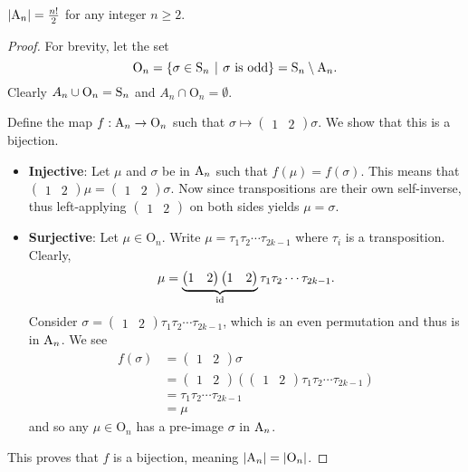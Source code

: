 \begin{proposition}\label{prop-order-of-An}
    $|\mathrm{A}_{n}| = \frac{n!}2$ for any integer $n \geq 2$.
\end{proposition}
\begin{proof}
    For brevity, let the set
    \[
        \mathrm{O}_n = \left\{\sigma \in \Sn{n} \vert \sigma \text{ is odd}\right\} = \Sn{n} \setminus \An{n}.
    \]
    Clearly $A_n \cup \mathrm{O}_n = \mathrm{S}_{n}$ and $A_n \cap \mathrm{O}_n = \emptyset$.

    Define the map $f: \mathrm{A}_{n} \to \mathrm{O}_n$ such that $\sigma \mapsto \begin{pmatrix}1 & 2\end{pmatrix}\sigma$. We show that this is a bijection.
    \begin{itemize}
        \item \textbf{Injective}: Let $\mu$ and $\sigma$ be in $\mathrm{A}_{n}$ such that $f(\mu) = f(\sigma)$. This means that $\begin{pmatrix}1 & 2\end{pmatrix}\mu = \begin{pmatrix}1 & 2\end{pmatrix}\sigma$. Now since transpositions are their own self-inverse, thus left-applying $\begin{pmatrix}1 & 2\end{pmatrix}$ on both sides yields $\mu = \sigma$.

        \item \textbf{Surjective}: Let $\mu \in \mathrm{O}_n$. Write $\mu = \tau_1\tau_2\cdots\tau_{2k-1}$ where $\tau_i$ is a transposition. Clearly,
        \[
            \mu = \underbrace{\begin{pmatrix}1 & 2\end{pmatrix}\begin{pmatrix}1 & 2\end{pmatrix}}_{\mathrm{id}}\tau_1\tau_2\cdots\tau_{2k-1}.
        \]
        Consider $\sigma = \begin{pmatrix}1 & 2\end{pmatrix}\tau_1\tau_2\cdots\tau_{2k-1}$, which is an even permutation and thus is in $\mathrm{A}_{n}$. We see
        \begin{align*}
            f(\sigma) &= \begin{pmatrix}1 & 2\end{pmatrix}\sigma\\
            &= \begin{pmatrix}1 & 2\end{pmatrix}\left(\begin{pmatrix}1 & 2\end{pmatrix}\tau_1\tau_2\cdots\tau_{2k-1}\right)\\
            &= \tau_1\tau_2\cdots\tau_{2k-1}\\
            &= \mu
        \end{align*}
        and so any $\mu \in \mathrm{O}_n$ has a pre-image $\sigma$ in $\mathrm{A}_{n}$.
    \end{itemize}
    This proves that $f$ is a bijection, meaning $|\mathrm{A}_{n}| = |\mathrm{O}_n|$.


\end{proof}

